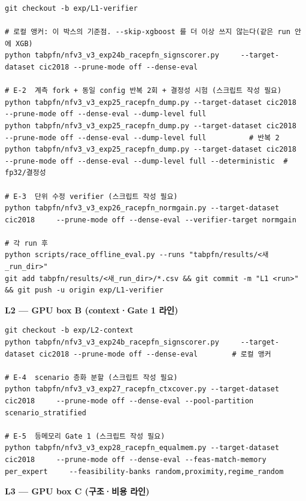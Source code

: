 \begin{Verbatim}[breaklines=true,breakanywhere=true,fontsize=\scriptsize]
git checkout -b exp/L1-verifier

# 로컬 앵커: 이 박스의 기준점. --skip-xgboost 를 더 이상 쓰지 않는다(같은 run 안에 XGB)
python tabpfn/nfv3_v3_exp24b_racepfn_signscorer.py     --target-dataset cic2018 --prune-mode off --dense-eval

# E-2  계측 fork + 동일 config 반복 2회 + 결정성 시험 (스크립트 작성 필요)
python tabpfn/nfv3_v3_exp25_racepfn_dump.py --target-dataset cic2018     --prune-mode off --dense-eval --dump-level full
python tabpfn/nfv3_v3_exp25_racepfn_dump.py --target-dataset cic2018     --prune-mode off --dense-eval --dump-level full          # 반복 2
python tabpfn/nfv3_v3_exp25_racepfn_dump.py --target-dataset cic2018     --prune-mode off --dense-eval --dump-level full --deterministic  # fp32/결정성

# E-3  단위 수정 verifier (스크립트 작성 필요)
python tabpfn/nfv3_v3_exp26_racepfn_normgain.py --target-dataset cic2018     --prune-mode off --dense-eval --verifier-target normgain

# 각 run 후
python scripts/race_offline_eval.py --runs "tabpfn/results/<새_run_dir>"
git add tabpfn/results/<새_run_dir>/*.csv && git commit -m "L1 <run>" && git push -u origin exp/L1-verifier

\end{Verbatim}
\textbf{L2 — GPU box B (context·Gate 1 라인)}


\begin{Verbatim}[breaklines=true,breakanywhere=true,fontsize=\scriptsize]
git checkout -b exp/L2-context
python tabpfn/nfv3_v3_exp24b_racepfn_signscorer.py     --target-dataset cic2018 --prune-mode off --dense-eval        # 로컬 앵커

# E-4  scenario 층화 분할 (스크립트 작성 필요)
python tabpfn/nfv3_v3_exp27_racepfn_ctxcover.py --target-dataset cic2018     --prune-mode off --dense-eval --pool-partition scenario_stratified

# E-5  등메모리 Gate 1 (스크립트 작성 필요)
python tabpfn/nfv3_v3_exp28_racepfn_equalmem.py --target-dataset cic2018     --prune-mode off --dense-eval --feas-match-memory per_expert     --feasibility-banks random,proximity,regime_random

\end{Verbatim}
\textbf{L3 — GPU box C (구조·비용 라인)}


